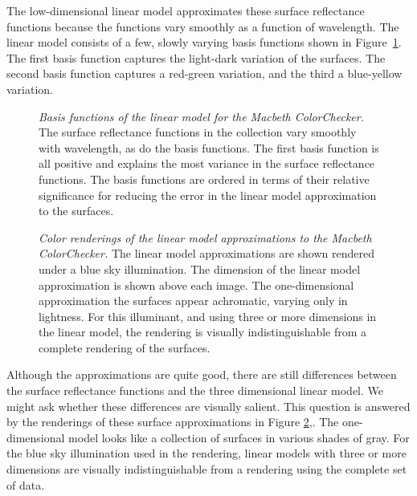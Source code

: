 The low-dimensional linear model approximates these surface
reflectance functions because the functions vary smoothly as a
function of wavelength.  The linear model consists of a few, slowly
varying basis functions shown in Figure~\ref{f8:macbethBasis}.  The
first basis function captures the light-dark variation of the
surfaces.  The second basis function captures a red-green variation,
and the third a blue-yellow variation.

\begin{figure}
\centerline{
}
\caption[Macbeth Basis Functions]{
{\em Basis functions of the linear model for the Macbeth
ColorChecker.}  The surface reflectance functions in the collection
vary smoothly with wavelength, as do the basis functions.  The first
basis function is all positive and explains the most variance in the
surface reflectance functions.  The basis functions are ordered in
terms of their relative significance for reducing the error in the
linear model approximation to the surfaces. }
\label{f8:macbethBasis}
\end{figure}

\begin{figure}
\centerline{
}
\caption[Macbeth Color Checker Approximations]{
{\em Color renderings of the linear model approximations to the
Macbeth ColorChecker.}  The linear model approximations are shown
rendered under a blue sky illumination. The dimension of the linear
model approximation is shown above each image.  The one-dimensional
approximation the surfaces appear achromatic, varying only in
lightness.  For this illuminant, and using three or more dimensions in
the linear model, the rendering is visually indistinguishable from a
complete rendering of the surfaces. }
\label{f8:macbethColor}
\end{figure}

Although the approximations are quite good, there are still
differences between the surface reflectance functions and the three
dimensional linear model.  We might ask whether these differences are
visually salient.  This question is answered by the renderings of
these surface approximations in Figure \ref{f8:macbethColor},.  The
one-dimensional model looks like a collection of surfaces in various
shades of gray.  For the blue sky illumination used in the rendering,
linear models with three or more dimensions are visually
indistinguishable from a rendering using the complete set of data.

